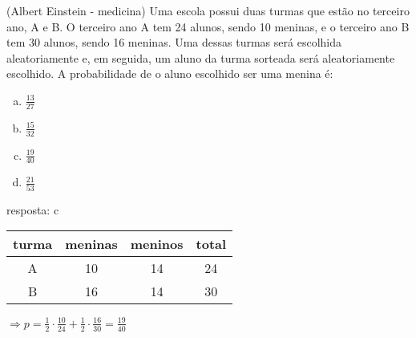 \begin{ex}
  (Albert Einstein - medicina) Uma escola possui duas turmas que estão no terceiro ano, A e B. O terceiro ano A tem 24 alunos, sendo 10 meninas, e o terceiro ano B tem 30 alunos, sendo 16 meninas. Uma dessas turmas será escolhida aleatoriamente e, em seguida, um aluno da turma sorteada será aleatoriamente escolhido. A probabilidade de o aluno escolhido ser uma menina é:   
     \begin{enumerate}  [(a)]
         \item $\frac{13}{27}$
         \item $\frac{15}{32}$
         \item $\frac{19}{40}$
         \item $\frac{21}{53}$
     \end{enumerate}
       \begin{sol}
       resposta: c \\
       \begin{tabular}{|c|c|c|c|} \hline
       turma & meninas & meninos & total  \\  \hline
       A & 10 & 14 & 24  \\  \hline
       B & 16 & 14 & 30  \\  \hline
       \end{tabular}
       $\Longrightarrow p=\frac{1}{2}\cdot\frac{10}{24}+\frac{1}{2}\cdot\frac{16}{30}=\frac{19}{40}$
       \end{sol}
 \end{ex}